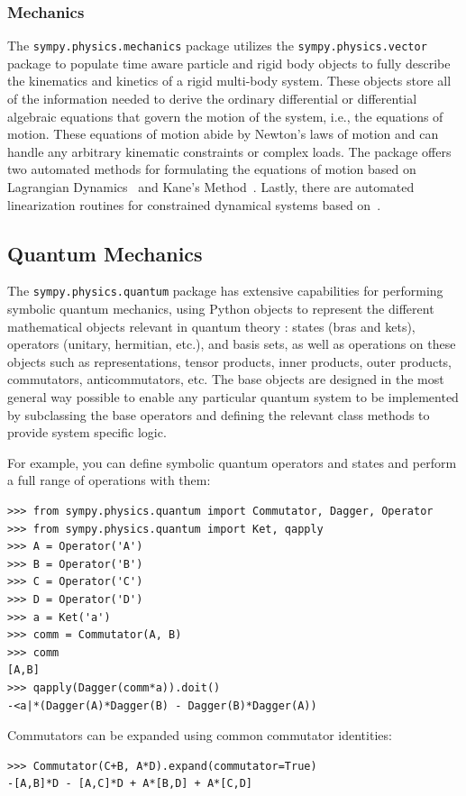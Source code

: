 \subsubsection{Mechanics}

The \verb|sympy.physics.mechanics| package utilizes the \texttt{sympy.\allowbreak{}physics.\allowbreak{}vector} package
to populate time aware particle and rigid body objects to fully describe the
kinematics and kinetics of a rigid multi-body system. These objects store all
of the information needed to derive the ordinary differential or differential
algebraic equations that govern the motion of the system, i.e., the equations
of motion. These equations of motion abide by Newton's laws of motion and can
handle any arbitrary kinematic constraints or complex loads. The package
offers two automated methods for formulating the equations of motion based on
Lagrangian Dynamics~\cite{Lagrange1811} and Kane's Method~\cite{Kane1985}. Lastly, there
are automated linearization routines for constrained dynamical
systems based on~\cite{Peterson2014}.

\subsection{Quantum Mechanics}

The \verb|sympy.physics.quantum| package has extensive capabilities for
performing symbolic quantum mechanics, using Python objects to represent the
different mathematical objects relevant in quantum theory \cite{Sakurai2010}:
states (bras and kets), operators (unitary, hermitian, etc.), and basis sets, as
well as operations on these objects such as representations, tensor products,
inner products, outer products, commutators, anticommutators, etc. The base
objects are designed in the most general way possible to enable any particular
quantum system to be implemented by subclassing the base operators and defining
the relevant class methods to provide system specific logic.

For example, you can define symbolic quantum operators and states and perform
a full range of operations with them:
\begin{verbatim}
>>> from sympy.physics.quantum import Commutator, Dagger, Operator
>>> from sympy.physics.quantum import Ket, qapply
>>> A = Operator('A')
>>> B = Operator('B')
>>> C = Operator('C')
>>> D = Operator('D')
>>> a = Ket('a')
>>> comm = Commutator(A, B)
>>> comm
[A,B]
>>> qapply(Dagger(comm*a)).doit()
-<a|*(Dagger(A)*Dagger(B) - Dagger(B)*Dagger(A))
\end{verbatim}
Commutators can be expanded using common commutator identities:
\begin{verbatim}
>>> Commutator(C+B, A*D).expand(commutator=True)
-[A,B]*D - [A,C]*D + A*[B,D] + A*[C,D]
\end{verbatim}

